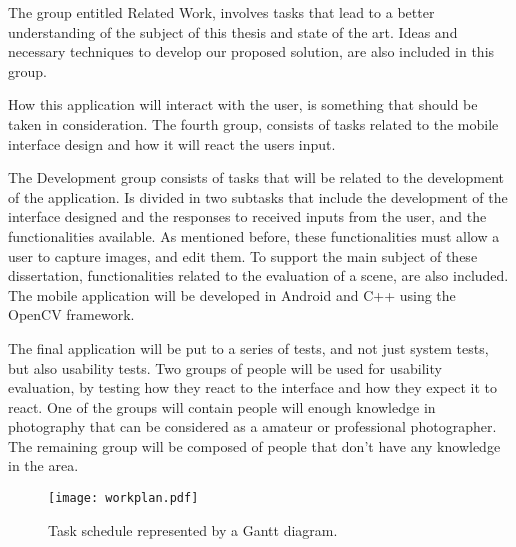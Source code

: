 The group entitled Related Work, involves tasks that lead to a better understanding of the subject of this thesis and state of the art. Ideas and necessary techniques to develop our proposed solution, are also included in this group.

How this application will interact with the user, is something that should be taken in consideration. The fourth group, consists of tasks related to the mobile interface design and how it will react the users input.

The Development group consists of tasks that will be related to the development of the application. Is divided in two subtasks that include the development of the interface designed and the responses to received inputs from the user, and the functionalities available. As mentioned before, these functionalities must allow a user to capture images, and edit them. To support the main subject of these dissertation, functionalities related to the evaluation of a scene, are also included. The mobile application will be developed in Android and C++ using the OpenCV framework\cite{OCV}. 

The final application will be put to a series of tests, and not just system tests, but also usability tests. Two groups of people will be used for usability evaluation, by testing how they react to the interface and how they expect it to react. One of the groups will contain people will enough knowledge in photography that can be considered as a amateur or professional photographer. The remaining group will be composed of people that don’t have any knowledge in the area.
\begin{figure}[htbp]
    \centering
    \texttt{[image: workplan.pdf]}
	\caption{Task schedule represented by a Gantt diagram.}
	\label{fig:workplan_diagram}
\end{figure}